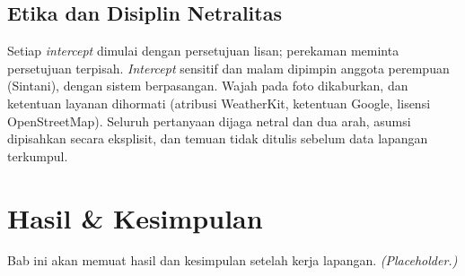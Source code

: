 \documentclass[11pt,a4paper]{report}
\begin{document}
\section{Etika dan Disiplin Netralitas}
Setiap \emph{intercept} dimulai dengan persetujuan lisan; perekaman meminta persetujuan terpisah.
\emph{Intercept} sensitif dan malam dipimpin anggota perempuan (Sintani), dengan sistem
berpasangan. Wajah pada foto dikaburkan, dan ketentuan layanan dihormati (atribusi WeatherKit,
ketentuan Google, lisensi OpenStreetMap). Seluruh pertanyaan dijaga netral dan dua arah, asumsi
dipisahkan secara eksplisit, dan temuan tidak ditulis sebelum data lapangan terkumpul.

\chapter{Hasil \& Kesimpulan}    %
Bab ini akan memuat hasil dan kesimpulan setelah kerja lapangan. \textit{(Placeholder.)}

\printbibliography[title={Daftar Pustaka}]
\end{document}
